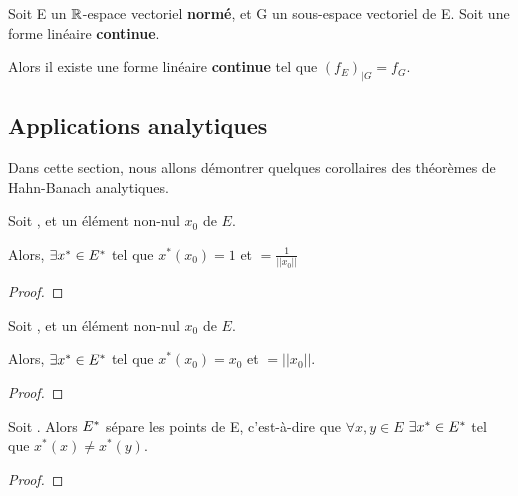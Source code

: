 \begin{theorem} 
	Soit E un $\mathbb{R}$-espace vectoriel \textbf{normé}, et G un sous-espace
	vectoriel de E.
	Soit  une forme linéaire
	\textbf{continue}.

	Alors il existe une forme linéaire \textbf{continue}
	 tel que $(f_{E})_{|G} = f_{G}$.
	\label{hahn-banach-analytic-2}
\end{theorem}

\subsection{Applications analytiques}

Dans cette section, nous allons démontrer quelques corollaires des théorèmes de
Hahn-Banach analytiques.

\begin{corollary}
	Soit , et un élément non-nul $x_{0}$ de $E$.

	Alors, $\exists x^{*} \in E^{*}$ tel que $x^{*}(x_{0}) = 1$ et
	 $= \frac{1}{||x_{0}||}$
\end{corollary}

\begin{proof}
	
\end{proof}

\begin{corollary}
	Soit , et un élément non-nul $x_{0}$ de $E$.

	Alors, $\exists x^{*} \in E^{*}$ tel que $x^{*}(x_{0}) = x_{0}$ et
	 $= ||x_{0}||$.
\end{corollary}

\begin{proof}
	
\end{proof}

\begin{corollary}
	Soit . Alors $E^{*}$ sépare les points de
	E, c'est-à-dire que $\forall x, y \in E$ $\exists x^{*} \in E^{*}$ tel
	que $x^{*}(x) \neq x^{*}(y)$.
\end{corollary}

\begin{proof}
	
\end{proof}

